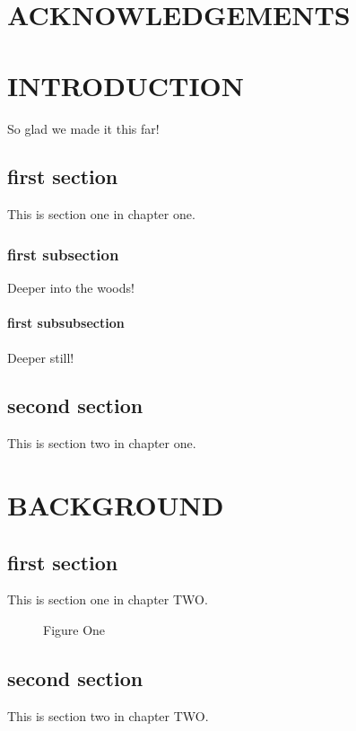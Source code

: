 \documentclass[12pt,english]{report}
\begin{document}
\setupTOC


\clearpage
{}

\clearpage
\chapter*{ACKNOWLEDGEMENTS}%

\clearpage
\tableofcontents

\clearpage
\listoffigures
\listoftables

\clearpage

\setupChapters

\chapter{INTRODUCTION}
So glad we made it this far!
\section{first section}
This is section one in chapter one.
\subsection{first subsection}
Deeper into the woods!
\subsubsection{first subsubsection}
Deeper still!
\section{second section }
This is section two  in chapter one.

\chapter{BACKGROUND}
\section{first section}
This is section one in chapter TWO.
\begin{figure}
\caption[Figure One]{Figure One}
\end{figure}
\section{second section }
This is section two  in chapter TWO.
\end{document}
